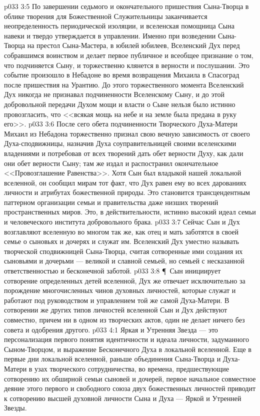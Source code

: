 \vs p033 3:5 По завершении седьмого и окончательного пришествия Сына\hyp{}Творца в облике творения для Божественной Служительницы заканчивается неопределенность периодической изоляции, и вселенская помощница Сына навеки и твердо утверждается в управлении. Именно при возведении Сына\hyp{}Творца на престол Сына\hyp{}Мастера, в юбилей юбилеев, Вселенский Дух перед собравшимся воинством и делает первое публичное и всеобщее признание о том, что подчиняется Сыну, и торжественно клянется в верности и послушании. Это событие произошло в Небадоне во время возвращения Михаила в Спасоград после пришествия на Урантию. До этого торжественного момента Вселенский Дух никогда не признавал подчиненности Вселенскому Сыну, и до этой добровольной передачи Духом мощи и власти о Сыне нельзя было истинно провозгласить, что <<всякая мощь на небе и на земле была предана в руку его>>.
\vs p033 3:6 После сего обета подчиненности Творческого Духа\hyp{}Матери Михаил из Небадона торжественно признал свою вечную зависимость от своего Духа\hyp{}сподвижницы, назначив Духа соуправительницей своими вселенскими владениями и потребовав от всех творений дать обет верности Духу, как дали они обет верности Сыну; там же издал и распостранил окончательное <<Провозглашение Равенства>>. Хотя Сын был владыкой нашей локальной вселенной, он сообщил мирам тот факт, что Дух равен ему во всех дарованиях личности и атрибутах божественной природы. Это становится трансцендентным паттерном организации семьи и правительства даже низших творений пространственных миров. Это, в действительности, истинно высокий идеал семьи и человеческого института добровольного брака.
\vs p033 3:7 Сейчас Сын и Дух возглавляют вселенную во многом так же, как отец и мать заботятся в своей семье о сыновьях и дочерях и служат им. Вселенский Дух уместно называть творческой сподвижницей Сына\hyp{}Творца, считая сотворенные ими создания их сыновьями и дочерьми --- великой и славной семьей, но семьей с несказанной ответственностью и бесконечной заботой.
\vs p033 3:8 \P\ Сын инициирует сотворение определенных детей вселенной, Дух же отвечает исключительно за порождение многочисленных чинов духовных личностей, которые служат и работают под руководством и управлением той же самой Духа\hyp{}Матери. В сотворении же других типов личностей вселенной Сын и Дух действуют совместно, причем ни в одном из творческих актов, один не делает ничего без совета и одобрения другого.
\vs p033 4:1 Яркая и Утренняя Звезда --- это персонализация первого понятия идентичности и идеала личности, задуманного Сыном\hyp{}Творцом, и выражение Бесконечного Духа в локальной вселенной. Еще в первые дни локальной вселенной, раньше объединения Сына\hyp{}Творца и Духа\hyp{}Матери в узах творческого сотрудничества, во времена, предшествующие сотворению их обширной семьи сыновей и дочерей, первое начальное совместное деяние этого первого и свободного союза двух божественных личностей приводит к сотворению высшей духовной личности Сына и Духа --- Яркой и Утренней Звезды.
